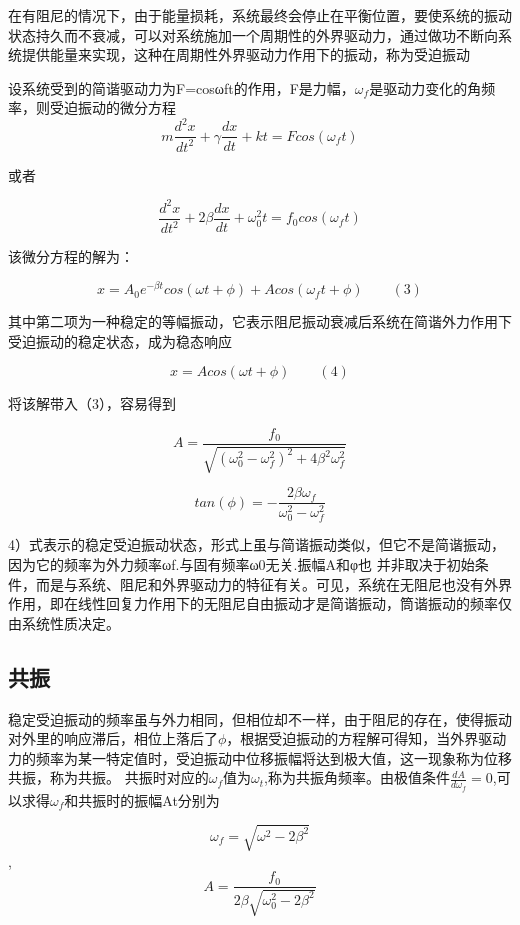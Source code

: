 \documentclass[12pt,a4paper]{ctexart}
\begin{document}
		在有阻尼的情况下，由于能量损耗，系统最终会停止在平衡位置，要使系统的振动状态持久而不衰减，可以对系统施加一个周期性的外界驱动力，通过做功不断向系统提供能量来实现，这种在周期性外界驱动力作用下的振动，称为受迫振动
	\hfill

	设系统受到的简谐驱动力为F=cosωft的作用，F是力幅，$\omega_f$是驱动力变化的角频率，则受迫振动的微分方程
	$$m\frac{d^2x}{dt^2}+\gamma\frac{dx}{dt}+kt=Fcos(\omega_f t)$$
	
	或者
	
	$$\frac{d^2x}{dt^2}+2\beta\frac{dx}{dt}+\omega_0^2t=f_0cos(\omega_f t)$$
	
	该微分方程的解为：
	
	$$x=A_0e^{-\beta t}cos(\omega t+\phi)+Acos(\omega_f t+\phi) \qquad(3)$$
	
	其中第二项为一种稳定的等幅振动，它表示阻尼振动衰减后系统在简谐外力作用下受迫振动的稳定状态，成为稳态响应
	
	$$x=Acos(\omega t+\phi)\qquad (4)$$
	
	将该解带入（3），容易得到
	
	$$A=\frac{f_0}{\sqrt{(\omega_0^2-\omega_f^2)^2+4\beta^2\omega_f^2}}$$
	
	$$tan(\phi)=-\frac{2\beta \omega_f}{\omega_0^2-\omega_f^2}$$
	
	4）式表示的稳定受迫振动状态，形式上虽与简谐振动类似，但它不是简谐振动，因为它的频率为外力频率ωf.与固有频率ω0无关.振幅A和φ也
	\noindent 并非取决于初始条件，而是与系统、阻尼和外界驱动力的特征有关。可见，系统在无阻尼也没有外界作用，即在线性回复力作用下的无阻尼自由振动才是简谐振动，筒谐振动的频率仅由系统性质决定。
	
	
	\subsection{共振}
	稳定受迫振动的频率虽与外力相同，但相位却不一样，由于阻尼的存在，使得振动对外里的响应滞后，相位上落后了$\phi$，根据受迫振动的方程解可得知，当外界驱动力的频率为某一特定值时，受迫振动中位移振幅将达到极大值，这一现象称为位移共振，称为共振。
	共振时对应的$\omega_f$值为$\omega_t$,称为共振角频率。由极值条件$\frac{dA}{d\omega_f}=0$,可以求得$\omega_f$和共振时的振幅At分别为
	
	$$\omega_f=\sqrt{\omega^2-2\beta^2}$$,$$A=\frac{f_0}{2\beta\sqrt{\omega_0^2-2\beta^2}}$$
	
\end{document}
